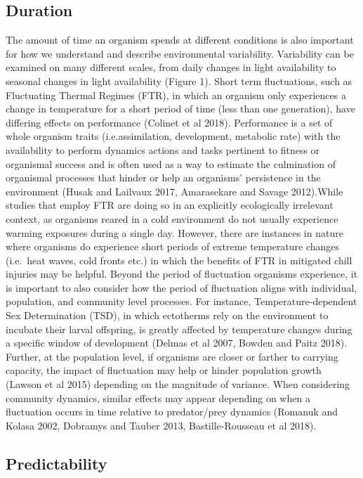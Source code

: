 \documentclass[12pt,twoside]{reedthesis}
\begin{document}
\hypertarget{duration}{%
\subsection{Duration}\label{duration}}

The amount of time an organism spends at different conditions is also important for how we understand and describe environmental variability. Variability can be examined on many different scales, from daily changes in light availability to seasonal changes in light availability (Figure 1). Short term fluctuations, such as Fluctuating Thermal Regimes (FTR), in which an organism only experiences a change in temperature for a short period of time (less than one generation), have differing effects on performance (Colinet et al 2018). Performance is a set of whole organism traits (i.e.assimilation, development, metabolic rate) with the availability to perform dynamics actions and tasks pertinent to fitness or organismal success and is often used as a way to estimate the culmination of organismal processes that hinder or help an organisms' persistence in the environment (Husak and Lailvaux 2017, Amarasekare and Savage 2012).While studies that employ FTR are doing so in an explicitly ecologically irrelevant context, as organisms reared in a cold environment do not usually experience warming exposures during a single day. However, there are instances in nature where organisms do experience short periods of extreme temperature changes (i.e.~heat waves, cold fronts etc.) in which the benefits of FTR in mitigated chill injuries may be helpful. Beyond the period of fluctuation organisms experience, it is important to also consider how the period of fluctuation aligns with individual, population, and community level processes. For instance, Temperature-dependent Sex Determination (TSD), in which ectotherms rely on the environment to incubate their larval offspring, is greatly affected by temperature changes during a specific window of development (Delmas et al 2007, Bowden and Paitz 2018). Further, at the population level, if organisms are closer or farther to carrying capacity, the impact of fluctuation may help or hinder population growth (Lawson et al 2015) depending on the magnitude of variance. When considering community dynamics, similar effects may appear depending on when a fluctuation occurs in time relative to predator/prey dynamics (Romanuk and Kolasa 2002, Dobramys and Tauber 2013, Bastille-Rousseau et al 2018).

\hypertarget{predictability}{%
\subsection{Predictability}\label{predictability}}
\end{document}
